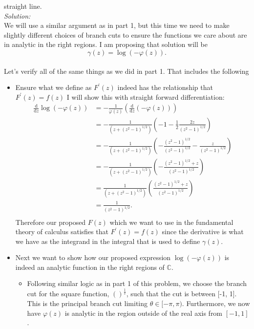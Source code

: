 \documentclass[10pt]{amsart}
\newcommand{\D}{\mathrm{d}}
\theoremstyle{nonumberplain}
\begin{document}
\begin{enumerate}[label={\bf {\arabic*}:}]
\begin{itemize}
   straight line. \\
   \textit{Solution:} \\
   We will use a similar argument as in part 1, but this time we need to make slightly different choices of branch cuts to ensure the functions we care about are in analytic in the right regions.
   I am proposing that solution will be \\
   $$
   \gamma(z) = \log(-\varphi(z)).
   $$ \\
   Let's verify all of the same things as we did in part 1.
   That includes the following
   \begin{itemize}
   \item Ensure what we define as $F^{\prime}(z)$ indeed has the relationship that $F^{\prime}(z) = f(z)$
   I will show this with straight forward differentiation:
   \begin{align*}
   \frac{\D}{\D z} \log (-\varphi(z)) &= -\frac{1}{\varphi(z)} \left( \frac{\D}{\D z} \left( - \varphi(z) \right) \right) \\
   						  &= -\frac{1}{(z + (z^2 - 1)^{1/2})}\left( - 1 - \frac{1}{2}\frac{2z}{(z^2 - 1)^{1/2}} \right) \\
						  &= -\frac{1}{(z + (z^2 - 1)^{1/2})}\left( -\frac{(z^2 - 1)^{1/2}}{(z^2 - 1)^{1/2}} - \frac{z}{(z^2 - 1)^{1/2}} \right) \\
						  &= - \frac{1}{(z + (z^2 - 1)^{1/2})}\left( - \frac{(z^2 - 1)^{1/2} + z}{(z^2 - 1)^{1/2}} \right) \\
						  &= \frac{1}{(z + (z^2 - 1)^{1/2})}\left( \frac{(z^2 - 1)^{1/2} + z}{(z^2 - 1)^{1/2}} \right) \\
						  &= \frac{1}{(z^2 - 1)^{1/2}}. \\
   \end{align*}
   Therefore our proposed $F(z)$ which we want to use in the fundamental theory of calculus satisfies that $F^\prime(z) = f(z)$ since the derivative is what we have as the integrand in the integral that is used to define $\gamma(z)$.
   \item Next we want to show how our proposed expression $\log(-\varphi(z))$ is indeed an analytic function in the right regions of $\mathbb{C}$.
   \begin{itemize}
   \item Following similar logic as in part 1 of this problem, we choose the branch cut for the square function, $()^\frac{1}{2}$, such that the cut is between [-1, 1].
   This is the principal branch cut limiting $\theta \in [-\pi, \pi)$.
   Furthermore, we now have $\varphi(z)$ is analytic in the region outside of the real axis from $[-1, 1]$.

\end{itemize}
\end{itemize}
\end{itemize}
\end{enumerate}
\end{document}
